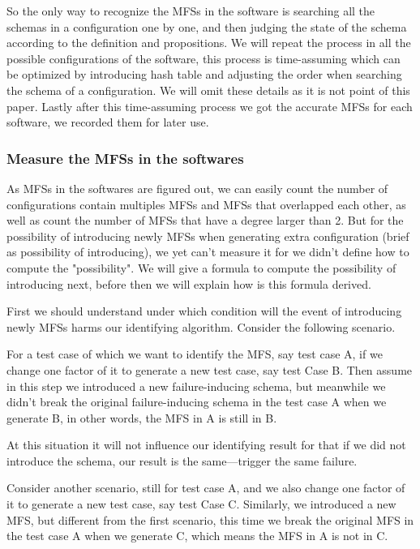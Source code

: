 \documentclass[10pt,journal,cspaper,compsoc]{IEEEtran}
\begin{document}
So the only way to recognize the MFSs in the software is searching all the schemas in a configuration one by one, and then judging the state of the schema according to the definition and propositions. We will repeat the process in all the possible configurations of the software, this process is time-assuming which can be optimized by introducing hash table and adjusting the order when searching the schema of a configuration. We will omit these details as it is not point of this paper. Lastly after this time-assuming process we got the accurate MFSs for each software, we recorded them for later use.

\subsubsection{Measure the MFSs in the softwares}
As MFSs in the softwares are figured out, we can easily count the number of configurations contain multiples MFSs and MFSs that overlapped each other, as well as count the number of  MFSs that have a degree larger than 2.  But for the possibility of introducing newly MFSs when generating extra configuration (brief as possibility of introducing), we yet can't measure it for we didn't define how to compute the "possibility". We will give a formula to compute the possibility of introducing next, before then we will explain how is this formula derived.

First we should understand under which condition will the event of introducing newly MFSs harms our identifying algorithm.  Consider the following scenario.

For a test case of which we want to identify the MFS, say test case A,  if we change one factor of it to generate a new test case, say test Case B.  Then assume in this step we introduced a new failure-inducing schema, but meanwhile we didn't break the original failure-inducing schema in the test case A when we generate B, in other words, the MFS in A is still in B.

At this situation it will not influence our identifying result for that if we did not introduce the schema, our result is the same---trigger the same failure.

Consider another scenario, still for test case A, and we also change one factor of it to generate a new test case, say test Case C. Similarly, we introduced a new MFS, but different from the first scenario, this time we break the original MFS in the test case A when we generate C, which means the MFS in A is not in C.
\end{document}

